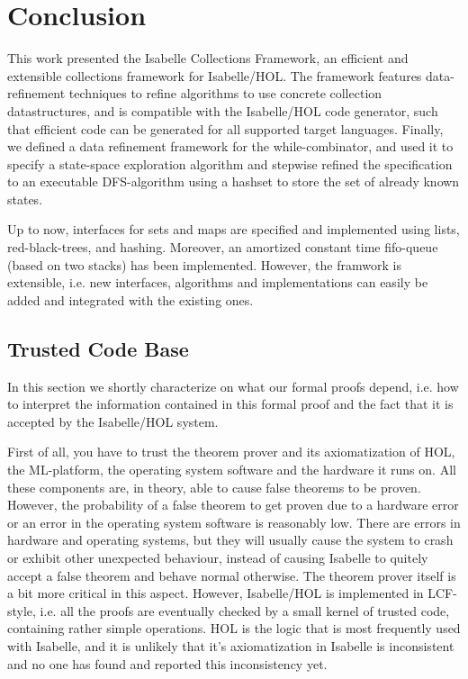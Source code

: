 \chapter{Conclusion}\label{ch:conclusion}

This work presented the Isabelle Collections Framework, an efficient and extensible collections framework for Isabelle/HOL.
The framework features data-refinement techniques to refine algorithms to use concrete collection datastructures,
and is compatible with the Isabelle/HOL code generator, such that efficient code can be generated for all supported target languages.
Finally, we defined a data refinement framework for the while-combinator, and used it to specify a state-space exploration algorithm
and stepwise refined the specification to an executable DFS-algorithm using a hashset to store the set of already known states.

Up to now, interfaces for sets and maps are specified and implemented using lists, red-black-trees, and hashing. Moreover, an amortized constant time 
fifo-queue (based on two stacks) has been implemented. However, the framwork is extensible, i.e. new interfaces, algorithms and implementations can easily be added and integrated with the existing ones.

\section {Trusted Code Base}
  In this section we shortly characterize on what our formal proofs depend, i.e. how to interpret the information contained in this formal proof and the fact that it
  is accepted by the Isabelle/HOL system.

  First of all, you have to trust the theorem prover and its axiomatization of HOL, the ML-platform, the operating system software and the hardware it runs on.
  All these components are, in theory, able to cause false theorems to be proven. However, the probability of a false theorem to get proven due to a hardware error 
  or an error in the operating system software is reasonably low. There are errors in hardware and operating systems, but they will usually cause the system to crash 
  or exhibit other unexpected behaviour, instead of causing Isabelle to quitely accept a false theorem and behave normal otherwise. The theorem prover itself is a bit more critical in this aspect. However, Isabelle/HOL is implemented in LCF-style, i.e. all the proofs are eventually checked by a small kernel of trusted code, containing rather simple operations. HOL is the logic that is most frequently used with Isabelle, and it is unlikely that it's axiomatization in Isabelle is inconsistent and no one has found and reported this inconsistency yet.

